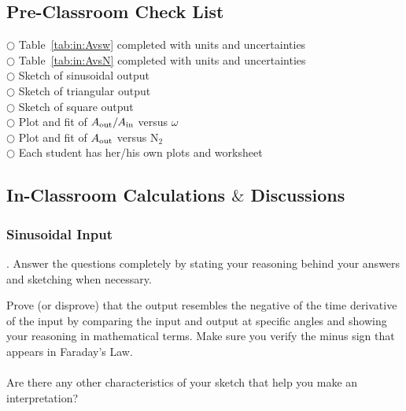 \subsection{Pre-Classroom Check List}
\noindent $\bigcirc$ \hspace*{1cm} Table~\ref{tab:in:Avsw} completed with units and uncertainties \\
$\bigcirc$ \hspace*{1cm} Table~\ref{tab:in:AvsN} completed with units and uncertainties \\
$\bigcirc$ \hspace*{1cm} Sketch of sinusoidal output \\
$\bigcirc$ \hspace*{1cm} Sketch of triangular output \\
$\bigcirc$ \hspace*{1cm} Sketch of square output \\
$\bigcirc$ \hspace*{1cm} Plot and fit of $A_{\rm{out}}/A_{\rm{in}}$ versus
$\omega$ \\
$\bigcirc$ \hspace*{1cm} Plot and fit of $A_{\rm{out}}$ versus N$_2$ \\
$\bigcirc$ \hspace*{1cm} Each student has her/his own plots and worksheet \\
 

\subsection{In-Classroom Calculations $\&$ Discussions}
\subsubsection{Sinusoidal Input}
. Answer the questions completely by  stating your 
reasoning
behind your answers and sketching when necessary. 

\noindent Prove (or disprove) that the output resembles the 
negative of the time derivative of 
the input by comparing the input and output at specific angles and 
showing your reasoning in mathematical terms. Make sure you verify the 
minus sign that appears in Faraday's Law. \\
\vspace*{7cm} \\
\noindent Are there any other characteristics of 
your sketch that help you make an interpretation? \\
\vspace*{3cm} \\

